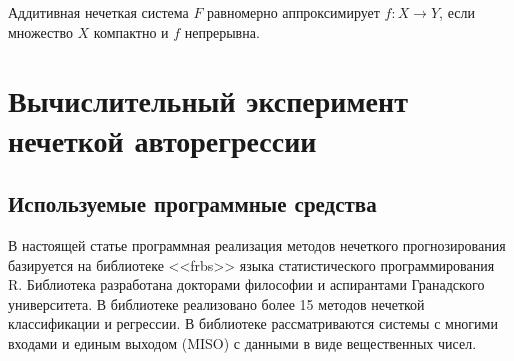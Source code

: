 \documentclass[a4paper,14pt]{article}
\begin{document}
\begin{theorem}
	\label{theorem:FAT}
	Аддитивная нечеткая система  $F$ равномерно аппроксимирует $f: X\rightarrow Y$, если множество $X$ компактно и $f$ непрерывна.
\end{theorem}

\section{Вычислительный эксперимент нечеткой авторегрессии}

\subsection{Используемые программные средства}

В настоящей статье программная реализация методов нечеткого прогнозирования
базируется на библиотеке <<frbs>> языка статистического программирования R. Библиотека разработана докторами философии и аспирантами Гранадского университета. В библиотеке реализовано более 15 методов нечеткой классификации и регрессии. В библиотеке рассматриваются системы с многими входами и единым выходом (MISO) с данными в виде вещественных чисел.
\end{document}
